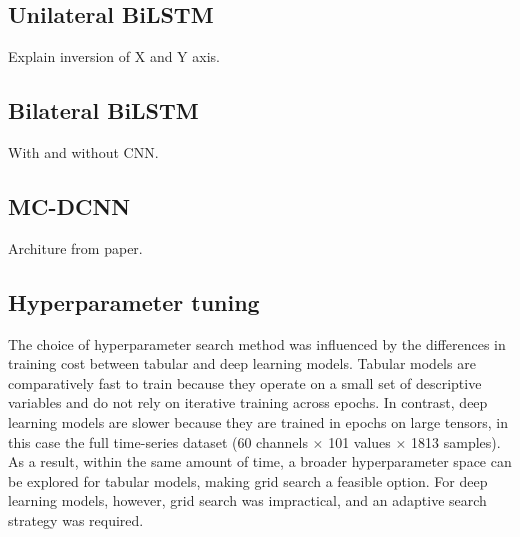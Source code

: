 \subsection{Unilateral BiLSTM}\label{subsec:method-unilat-bilstm}
Explain inversion of X and Y axis.
\subsection{Bilateral BiLSTM}\label{subsec:method-bilat-bilstm}
With and without CNN.
\subsection{MC-DCNN}\label{subsec:method-mc-dcnn}
Architure from paper.

\subsection{Hyperparameter tuning}\label{subsec:method-hyperparam-tuning}
The choice of hyperparameter search method was influenced by the differences in training cost between tabular and deep learning models. Tabular models are comparatively fast to train because they operate on a small set of descriptive variables and do not rely on iterative training across epochs. In contrast, deep learning models are slower because they are trained in epochs on large tensors, in this case the full time-series dataset (60 channels $\times$ 101 values $\times$ 1813 samples). As a result, within the same amount of time, a broader hyperparameter space can be explored for tabular models, making grid search a feasible option. For deep learning models, however, grid search was impractical, and an adaptive search strategy was required.


